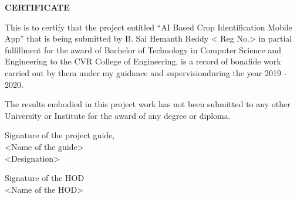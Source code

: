 \begin{center}
    \textbf{CERTIFICATE}
\end{center}

\setlength{\leftskip}{1.2cm}
This is to certify that the project entitled “AI Based Crop Identification Mobile App” 
that is being submitted by B. Sai Hemanth Reddy < Reg No.> in partial fulfillment for 
the award of Bachelor of Technology in Computer Science and  Engineering to the 
CVR College of Engineering, is a record of bonafide work carried out by them under my 
guidance and supervisionduring the year 2019 - 2020.

\vspace{\baselineskip}

\setlength{\leftskip}{1.2cm}
The results embodied in this project work has not been submitted to any other University 
or Institute for the award of any degree or diploma.

\vspace{\baselineskip}\vspace{\baselineskip}

\setlength{\leftskip}{0pt}
\begin{minipage}[t]{.5\textwidth}
    \raggedright
    Signature of the project guide, \\
    <Name of the guide> \\
    <Designation>
\end{minipage}%
\begin{minipage}[t]{.5\textwidth}
    \raggedleft
    Signature of the HOD \\
    <Name of the HOD>
\end{minipage}